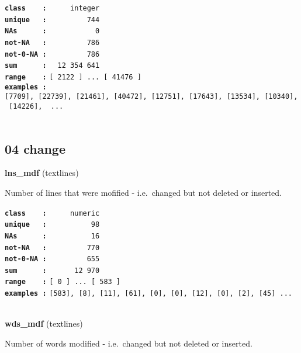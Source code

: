 \documentclass[]{article}
\begin{document}
\textbf{\texttt{class\ \ \ \ :}} \texttt{~~~~~integer}\\
\textbf{\texttt{unique\ \ \ :}} \texttt{~~~~~~~~~744}\\
\textbf{\texttt{NAs\ \ \ \ \ \ :}} \texttt{~~~~~~~~~~~0}\\
\textbf{\texttt{not-NA\ \ \ :}} \texttt{~~~~~~~~~786}\\
\textbf{\texttt{not-0-NA\ :}} \texttt{~~~~~~~~~786}\\
\textbf{\texttt{sum\ \ \ \ \ \ :}} \texttt{~~12~354~641}\\
\textbf{\texttt{range\ \ \ \ :}}
\texttt{{[}\ 2122\ {]}\ ...\ {[}\ 41476\ {]}}\\
\textbf{\texttt{examples\ :}}
\texttt{{[}7709{]},\ {[}22739{]},\ {[}21461{]},\ {[}40472{]},\ {[}12751{]},\ {[}17643{]},\ {[}13534{]},\ {[}10340{]},\ {[}14226{]},\ \ ...}\\

~

\subsection{04 change}\label{change}

\textbf{lns\_mdf} (textlines)

Number of lines that were mofified - i.e.~changed but not deleted or
inserted.

\textbf{\texttt{class\ \ \ \ :}} \texttt{~~~~~numeric}\\
\textbf{\texttt{unique\ \ \ :}} \texttt{~~~~~~~~~~98}\\
\textbf{\texttt{NAs\ \ \ \ \ \ :}} \texttt{~~~~~~~~~~16}\\
\textbf{\texttt{not-NA\ \ \ :}} \texttt{~~~~~~~~~770}\\
\textbf{\texttt{not-0-NA\ :}} \texttt{~~~~~~~~~655}\\
\textbf{\texttt{sum\ \ \ \ \ \ :}} \texttt{~~~~~~12~970}\\
\textbf{\texttt{range\ \ \ \ :}}
\texttt{{[}\ 0\ {]}\ ...\ {[}\ 583\ {]}}\\
\textbf{\texttt{examples\ :}}
\texttt{{[}583{]},\ {[}8{]},\ {[}11{]},\ {[}61{]},\ {[}0{]},\ {[}0{]},\ {[}12{]},\ {[}0{]},\ {[}2{]},\ {[}45{]}\ ...}\\

~

\textbf{wds\_mdf} (textlines)

Number of words modified - i.e.~changed but not deleted or inserted.
\end{document}
